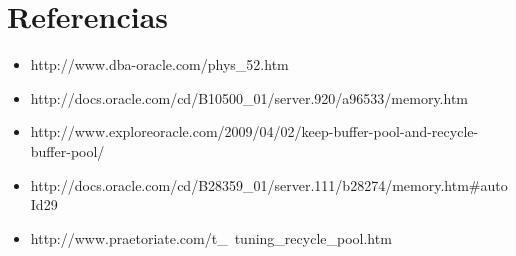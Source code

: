 \documentclass[10pt, a4paper,english,spanish]{article}
\begin{document}

\maketitle
\pagebreak

\tableofcontents
\pagebreak


\newpage


\newpage


\newpage


\newpage

\section{Referencias}
\begin{itemize}
	\item http://www.dba-oracle.com/phys\_52.htm
	\item http://docs.oracle.com/cd/B10500\_01/server.920/a96533/memory.htm
	\item http://www.exploreoracle.com/2009/04/02/keep-buffer-pool-and-recycle-buffer-pool/
	\item http://docs.oracle.com/cd/B28359\_01/server.111/b28274/memory.htm\#autoId29
	\item http://www.praetoriate.com/t\_\ tuning\_recycle\_pool.htm
\end{itemize}
\end{document}
